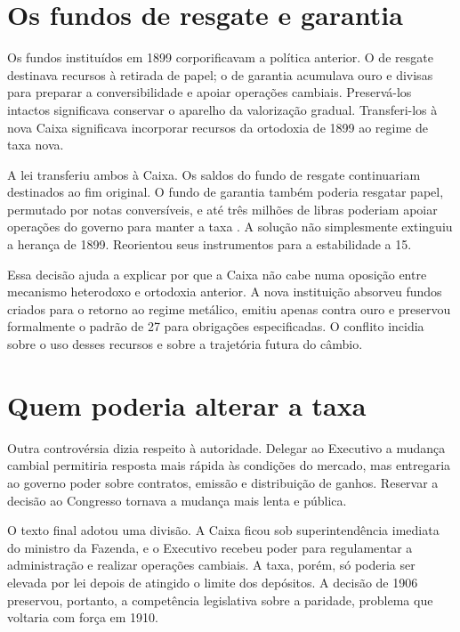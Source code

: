 \section{Os fundos de resgate e garantia}

Os fundos instituídos em 1899 corporificavam a política anterior. O de resgate destinava recursos à retirada de papel; o de garantia acumulava ouro e divisas para preparar a conversibilidade e apoiar operações cambiais. Preservá-los intactos significava conservar o aparelho da valorização gradual. Transferi-los à nova Caixa significava incorporar recursos da ortodoxia de 1899 ao regime de taxa nova.

A lei transferiu ambos à Caixa. Os saldos do fundo de resgate continuariam destinados ao fim original. O fundo de garantia também poderia resgatar papel, permutado por notas conversíveis, e até três milhões de libras poderiam apoiar operações do governo para manter a taxa \cite{brasil1906caixa}. A solução não simplesmente extinguiu a herança de 1899. Reorientou seus instrumentos para a estabilidade a 15.

Essa decisão ajuda a explicar por que a Caixa não cabe numa oposição entre mecanismo heterodoxo e ortodoxia anterior. A nova instituição absorveu fundos criados para o retorno ao regime metálico, emitiu apenas contra ouro e preservou formalmente o padrão de 27 para obrigações especificadas. O conflito incidia sobre o uso desses recursos e sobre a trajetória futura do câmbio.

\section{Quem poderia alterar a taxa}

Outra controvérsia dizia respeito à autoridade. Delegar ao Executivo a mudança cambial permitiria resposta mais rápida às condições do mercado, mas entregaria ao governo poder sobre contratos, emissão e distribuição de ganhos. Reservar a decisão ao Congresso tornava a mudança mais lenta e pública.

O texto final adotou uma divisão. A Caixa ficou sob superintendência imediata do ministro da Fazenda, e o Executivo recebeu poder para regulamentar a administração e realizar operações cambiais. A taxa, porém, só poderia ser elevada por lei depois de atingido o limite dos depósitos. A decisão de 1906 preservou, portanto, a competência legislativa sobre a paridade, problema que voltaria com força em 1910.


